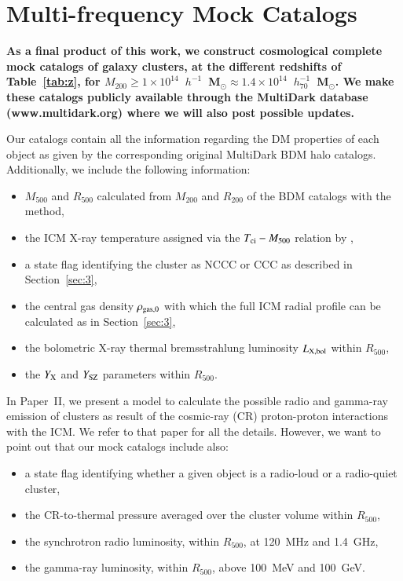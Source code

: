 \documentclass[useAMS,usenatbib]{mn2e}
\begin{document}
\section{Multi-frequency Mock Catalogs}
\label{sec:6}

{\bf As a final product of this work, we construct cosmological complete mock catalogs of galaxy clusters, at the different redshifts of 
Table~\ref{tab:z}, for $M_{200}\geq1\times10^{14}$~$h^{-1}$~M$_{\odot}\approx1.4\times10^{14}$~$h_{70}^{-1}$~M$_{\odot}$.
We make these catalogs publicly available through the MultiDark database 
(www.multidark.org) where we will also post possible updates.

Our catalogs contain all the information regarding the DM properties of each object as 
given by the corresponding original MultiDark BDM halo catalogs. Additionally, we include the
following information:

\begin{itemize}
\item $M_{500}$ and $R_{500}$ calculated from $M_{200}$ and $R_{200}$ of the BDM catalogs with the \cite{2003ApJ...584..702H} method,
\item the ICM X-ray temperature assigned via the $T_{{\mathrm{ci}}}-M_{500}$ relation by \cite{2010MNRAS.406.1773M},
\item a state flag identifying the cluster as NCCC or CCC as described in Section~\ref{sec:3},
\item the central gas density $\rho_{{\mathrm{gas}},0}$ with which the full ICM radial profile can be calculated as in Section~\ref{sec:3},
\item the bolometric X-ray thermal bremsstrahlung luminosity $L_{{\mathrm{X, bol}}}$ within $R_{500}$,
\item the $Y_{{\mathrm{X}}}$ and $Y_{{\mathrm{SZ}}}$ parameters within $R_{500}$.
\end{itemize}

In Paper~II, we present a model to calculate the possible radio and gamma-ray emission of 
clusters as result of the cosmic-ray (CR) proton-proton interactions with the ICM. We refer
to that paper for all the details. However, we want to point out that our mock catalogs include also:

\begin{itemize}
\item a state flag identifying whether a given object is a radio-loud or a radio-quiet cluster, 
\item the CR-to-thermal pressure averaged over the cluster volume within $R_{500}$,
\item the synchrotron radio luminosity, within $R_{500}$, at 120~MHz and 1.4~GHz,
\item the gamma-ray luminosity, within $R_{500}$, above 100~MeV and 100~GeV.
\end{itemize}

}
\end{document}
